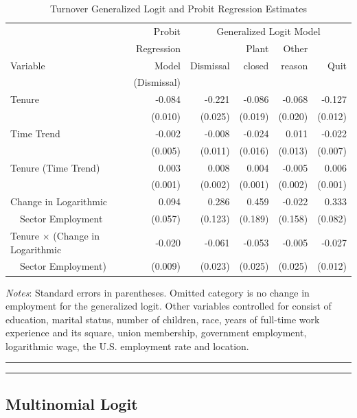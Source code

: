 \begin{table}[h]
\caption{\label{T11:GLogitTurnover} Turnover Generalized Logit and
Probit Regression Estimates}
\begin{center}
\begin{tabular}{lrrrrr}
\hline
 & Probit & \multicolumn{4}{c}{Generalized Logit Model} \\
 \cline{3-6}
         & Regression & & Plant & Other & \\
Variable & Model & Dismissal & closed & reason & Quit \\
& (Dismissal)\\
 \hline
Tenure  & -0.084  &  -0.221  &  -0.086   & -0.068  &  -0.127 \\
   &     (0.010)  & (0.025)  & (0.019)  & (0.020)  & (0.012) \\
Time Trend  &  -0.002  &  -0.008  &  -0.024  &  0.011  &   -0.022 \\
            &  (0.005)  & (0.011)  & (0.016)  & (0.013) &  (0.007)
            \\
Tenure   (Time Trend)  &    0.003  &   0.008   &  0.004  &   -0.005
& 0.006 \\
  &    (0.001)  & (0.002) &  (0.001) &  (0.002) &  (0.001) \\
Change in Logarithmic   &  0.094  &   0.286   &
0.459  & -0.022  & 0.333 \\
~~Sector Employment    &  (0.057)  & (0.123)  & (0.189)  & (0.158)  & (0.082) \\
Tenure $\times$  (Change in Logarithmic& -0.020
 & -0.061 &  -0.053  &  -0.005   & -0.027 \\
~~Sector Employment) &    (0.009)  &  (0.023)  &  (0.025)  & (0.025)  & (0.012) \\
\hline
\end{tabular}
\flushleft \small {\textit{Notes}: Standard errors in parentheses. Omitted
category is no change in employment for the generalized logit. Other variables controlled for
consist of education, marital status, number of children, race,
years of full-time work experience and its square, union membership,
government employment, logarithmic wage, the U.S. employment rate
and location.}
\end{center}
\noindent
\rule{5.5in}{.008in}\vspace{-.1in}\newline\rule{5.5in}{.008in}
 \end{table}
\newpage

\subsection{Multinomial Logit}

